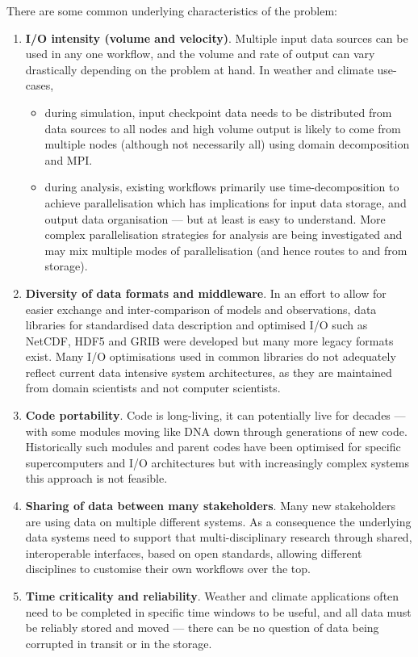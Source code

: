 There are some common underlying characteristics of the problem:
\begin{enumerate}
\item \textbf{I/O intensity (volume and velocity)}.
Multiple input data sources can be used in any one workflow, and the volume and rate of output can vary drastically depending on the problem at hand. In weather and climate use-cases,
\begin{itemize}
\item during simulation, input checkpoint data needs to be distributed from data sources to all nodes and high volume output is likely to come from multiple nodes (although not necessarily all) using domain decomposition and MPI.
\item during analysis, existing workflows primarily use time-decomposition to achieve parallelisation which has implications for input data storage, and output data organisation --- but at least is easy to understand. More complex parallelisation strategies for analysis are being investigated and may mix multiple modes of parallelisation (and hence routes to and from storage).
\end{itemize}

\item \textbf{Diversity of data formats and middleware}.
In an effort to allow for easier exchange and inter-comparison of models and observations, data libraries for standardised data description and optimised I/O such as NetCDF, HDF5 and GRIB were developed but many more legacy formats exist.
Many I/O optimisations used in common libraries do not adequately reflect current data intensive system architectures, as they are maintained from
domain scientists and not computer scientists.

\item \textbf{Code portability}. Code is long-living, it can potentially live
for decades --- with some modules moving like DNA down through generations of new code. Historically such modules and parent codes have been optimised for specific supercomputers  and I/O architectures but with increasingly complex systems this approach is not feasible.
\item \textbf{Sharing of data between many stakeholders}.
Many new stakeholders are using data on multiple different systems.
As a consequence the underlying data systems need to support that multi-disciplinary research through shared, interoperable interfaces, based on open standards, allowing different disciplines to customise their own workflows over the top.

\item \textbf{Time criticality and reliability}. Weather and climate applications
often need to be completed in specific time windows to be useful, and all
data must be reliably stored and moved --- there can be no question of
data being corrupted in transit or in the storage.

\end{enumerate}

